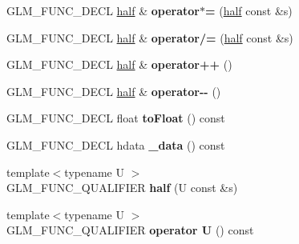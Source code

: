 \begin{DoxyCompactItemize}
\item 
\hypertarget{classglm_1_1detail_1_1half_ad50a91d350571ad0951e33104dd9b6b4}{G\-L\-M\-\_\-\-F\-U\-N\-C\-\_\-\-D\-E\-C\-L \hyperlink{classglm_1_1detail_1_1half}{half} \& {\bfseries operator$\ast$=} (\hyperlink{classglm_1_1detail_1_1half}{half} const \&s)}\label{classglm_1_1detail_1_1half_ad50a91d350571ad0951e33104dd9b6b4}

\item 
\hypertarget{classglm_1_1detail_1_1half_a96c0c6855e855f48eea862bdc3614b17}{G\-L\-M\-\_\-\-F\-U\-N\-C\-\_\-\-D\-E\-C\-L \hyperlink{classglm_1_1detail_1_1half}{half} \& {\bfseries operator/=} (\hyperlink{classglm_1_1detail_1_1half}{half} const \&s)}\label{classglm_1_1detail_1_1half_a96c0c6855e855f48eea862bdc3614b17}

\item 
\hypertarget{classglm_1_1detail_1_1half_afa3be73cc6f70b1ba65f611881e430c1}{G\-L\-M\-\_\-\-F\-U\-N\-C\-\_\-\-D\-E\-C\-L \hyperlink{classglm_1_1detail_1_1half}{half} \& {\bfseries operator++} ()}\label{classglm_1_1detail_1_1half_afa3be73cc6f70b1ba65f611881e430c1}

\item 
\hypertarget{classglm_1_1detail_1_1half_ae9639e4a60575cd5650af08446030c77}{G\-L\-M\-\_\-\-F\-U\-N\-C\-\_\-\-D\-E\-C\-L \hyperlink{classglm_1_1detail_1_1half}{half} \& {\bfseries operator-\/-\/} ()}\label{classglm_1_1detail_1_1half_ae9639e4a60575cd5650af08446030c77}

\item 
\hypertarget{classglm_1_1detail_1_1half_a0de0a6504597d926db7709d43982162a}{G\-L\-M\-\_\-\-F\-U\-N\-C\-\_\-\-D\-E\-C\-L float {\bfseries to\-Float} () const }\label{classglm_1_1detail_1_1half_a0de0a6504597d926db7709d43982162a}

\item 
\hypertarget{classglm_1_1detail_1_1half_a40dad9839e2e18fe203fcbd7fbbccc80}{G\-L\-M\-\_\-\-F\-U\-N\-C\-\_\-\-D\-E\-C\-L hdata {\bfseries \-\_\-data} () const }\label{classglm_1_1detail_1_1half_a40dad9839e2e18fe203fcbd7fbbccc80}

\item 
\hypertarget{classglm_1_1detail_1_1half_a537bce479b8d589b3f849edac71ce5f4}{{\footnotesize template$<$typename U $>$ }\\G\-L\-M\-\_\-\-F\-U\-N\-C\-\_\-\-Q\-U\-A\-L\-I\-F\-I\-E\-R {\bfseries half} (U const \&s)}\label{classglm_1_1detail_1_1half_a537bce479b8d589b3f849edac71ce5f4}

\item 
\hypertarget{classglm_1_1detail_1_1half_a22bf1e84f5baab5699595972585a8be5}{{\footnotesize template$<$typename U $>$ }\\G\-L\-M\-\_\-\-F\-U\-N\-C\-\_\-\-Q\-U\-A\-L\-I\-F\-I\-E\-R {\bfseries operator U} () const }\label{classglm_1_1detail_1_1half_a22bf1e84f5baab5699595972585a8be5}

\end{DoxyCompactItemize}


